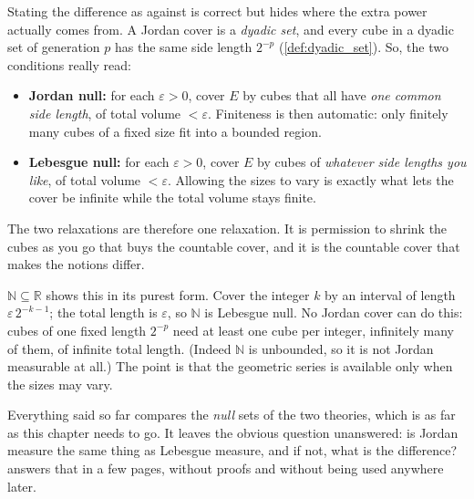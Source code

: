 \begin{remark}
\label{rem:jordan_vs_lebesgue_sizes}
Stating the difference as  against  is correct but hides
where the extra power actually comes from. A Jordan cover is a \emph{dyadic set}, and every cube
in a dyadic set of generation $p$ has the same side length $2^{-p}$
(\cref{def:dyadic_set}). So, the two conditions really read:
\begin{itemize}
  \item \textbf{Jordan null:} for each $\varepsilon>0$, cover $E$ by cubes that all have
    \emph{one common side length}, of total volume $<\varepsilon$. Finiteness is then automatic:
    only finitely many cubes of a fixed size fit into a bounded region.
  \item \textbf{Lebesgue null:} for each $\varepsilon>0$, cover $E$ by cubes of \emph{whatever
    side lengths you like}, of total volume $<\varepsilon$. Allowing the sizes to vary is exactly
    what lets the cover be infinite while the total volume stays finite.
\end{itemize}
The two relaxations are therefore one relaxation. It is permission to shrink the cubes as you go
that buys the countable cover, and it is the countable cover that makes the notions differ.

$\mathbb{N} \subseteq \mathbb{R}$ shows this in its purest form. Cover the integer $k$ by an
interval of length $\varepsilon\,2^{-k-1}$; the total length is $\varepsilon$, so $\mathbb{N}$ is
Lebesgue null. No Jordan cover can do this: cubes of one fixed length $2^{-p}$ need at least one
cube per integer, infinitely many of them, of infinite total length. (Indeed $\mathbb{N}$ is
unbounded, so it is not Jordan measurable at all.) The point is that the geometric series is
available only when the sizes may vary.
\end{remark}

\begin{remark}
\label{rem:pointer_to_lebesgue_digression}
Everything said so far compares the \emph{null} sets of the two theories, which is as far as this
chapter needs to go. It leaves the obvious question unanswered: is Jordan measure the same thing as
Lebesgue measure, and if not, what is the difference?  answers that
in a few pages, without proofs and without being used anywhere later.
\end{remark}

